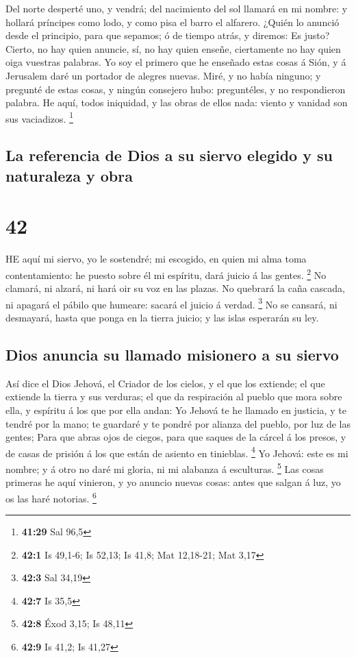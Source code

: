  Del norte desperté uno, y vendrá; del nacimiento del sol
llamará en mi nombre: y hollará príncipes como lodo, y como pisa el
barro el alfarero.  ¿Quién lo anunció desde el principio,
para que sepamos; ó de tiempo atrás, y diremos: Es justo? Cierto, no hay
quien anuncie, sí, no hay quien enseñe, ciertamente no hay quien oiga
vuestras palabras.  Yo soy el primero que he enseñado estas
cosas á Sión, y á Jerusalem daré un portador de alegres nuevas.
 Miré, y no había ninguno; y pregunté de estas cosas, y
ningún consejero hubo: preguntéles, y no respondieron palabra.
 He aquí, todos iniquidad, y las obras de ellos nada:
viento y vanidad son sus vaciadizos. \footnote{\textbf{41:29} Sal 96,5}

\hypertarget{la-referencia-de-dios-a-su-siervo-elegido-y-su-naturaleza-y-obra}{%
\subsection{La referencia de Dios a su siervo elegido y su naturaleza y
obra}\label{la-referencia-de-dios-a-su-siervo-elegido-y-su-naturaleza-y-obra}}

\hypertarget{section-41}{%
\section{42}\label{section-41}}

 HE aquí mi siervo, yo le sostendré; mi escogido, en quien
mi alma toma contentamiento: he puesto sobre él mi espíritu, dará juicio
á las gentes. \footnote{\textbf{42:1} Is 49,1-6; Is 52,13; Is 41,8; Mat
  12,18-21; Mat 3,17}  No clamará, ni alzará, ni hará oir su
voz en las plazas.  No quebrará la caña cascada, ni apagará
el pábilo que humeare: sacará el juicio á verdad. \footnote{\textbf{42:3}
  Sal 34,19}  No se cansará, ni desmayará, hasta que ponga
en la tierra juicio; y las islas esperarán su ley.

\hypertarget{dios-anuncia-su-llamado-misionero-a-su-siervo}{%
\subsection{Dios anuncia su llamado misionero a su
siervo}\label{dios-anuncia-su-llamado-misionero-a-su-siervo}}

 Así dice el Dios Jehová, el Criador de los cielos, y el que
los extiende; el que extiende la tierra y sus verduras; el que da
respiración al pueblo que mora sobre ella, y espíritu á los que por ella
andan:  Yo Jehová te he llamado en justicia, y te tendré por
la mano; te guardaré y te pondré por alianza del pueblo, por luz de las
gentes;  Para que abras ojos de ciegos, para que saques de
la cárcel á los presos, y de casas de prisión á los que están de asiento
en tinieblas. \footnote{\textbf{42:7} Is 35,5}  Yo Jehová:
este es mi nombre; y á otro no daré mi gloria, ni mi alabanza á
esculturas. \footnote{\textbf{42:8} Éxod 3,15; Is 48,11} 
Las cosas primeras he aquí vinieron, y yo anuncio nuevas cosas: antes
que salgan á luz, yo os las haré notorias. \footnote{\textbf{42:9} Is
  41,2; Is 41,27}


